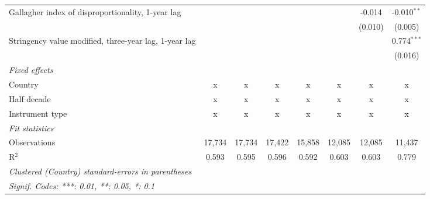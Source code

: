 \begin{table}[htbp]
\begin{tabular}{lccccccc}
      Gallagher index of disproportionality, 1-year lag     &         &         &              &               &               & -0.014        & -0.010$^{**}$\\   
                                                            &         &         &              &               &               & (0.010)       & (0.005)\\   
      Stringency value modified, three-year lag, 1-year lag &         &         &              &               &               &               & 0.774$^{***}$\\   
                                                            &         &         &              &               &               &               & (0.016)\\   
      \emph{Fixed effects}\\
      Country                                               & x       & x       & x            & x             & x             & x             & x\\  
      Half decade                                           & x       & x       & x            & x             & x             & x             & x\\  
      Instrument type                                       & x       & x       & x            & x             & x             & x             & x\\  
      \midrule \emph{Fit statistics}\\
      Observations                                          & 17,734  & 17,734  & 17,422       & 15,858        & 12,085        & 12,085        & 11,437\\  
      R$^2$                                                 & 0.593   & 0.595   & 0.596        & 0.592         & 0.603         & 0.603         & 0.779\\  
      \midrule
      \multicolumn{8}{l}{\emph{Clustered (Country) standard-errors in parentheses}}\\
      \multicolumn{8}{l}{\emph{Signif. Codes: ***: 0.01, **: 0.05, *: 0.1}}\\
   \end{tabular}
\end{table}


